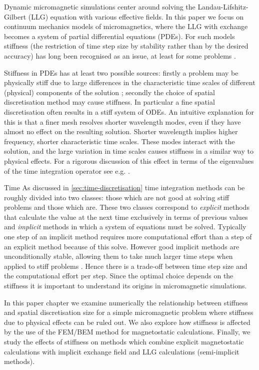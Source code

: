 \documentclass[10pt, final, conference, transmag]{IEEEtran}
\begin{document}
Dynamic micromagnetic simulations  center around solving the Landau-Lifshitz-Gilbert (LLG) equation with various effective fields.
In this paper we focus on continuum mechanics models of micromagnetics, where the LLG with exchange becomes a system of partial differential equations (PDEs).
For such models stiffness (the restriction of time step size by stability rather than by the desired accuracy) has long been recognised as an issue, at least for some problems
\cite{Nakatani1989}.

Stiffness in PDEs has at least two possible sources: 
firstly a problem may be physically stiff due to large differences in the characteristic time scales of different (physical) components of the solution \cite[Chap. 4]{Iserles2009};
secondly the choice of spatial discretisation method may cause stiffness.
In particular a fine spatial discretisation often results in a stiff system of ODEs.
An intuitive explanation for this is that a finer mesh resolves shorter wavelength modes, even if they have almost no effect on the resulting solution.
Shorter wavelength implies higher frequency, \ie shorter characteristic time scales.
These modes interact with the solution, and the large variation in time scales causes stiffness in a similar way to physical effects.
For a rigorous discussion of this effect in terms of the eigenvalues of the time integration operator see e.g. \cite[Sec 8.2]{Atkinson2009}.

\iftransmagpaper Time  \else As discussed in \autoref{sec:time-discretisation} time \fi integration methods can be roughly divided into two classes: those which are not good at solving stiff problems and those which are.
These two classes correspond to \emph{explicit} methods that calculate the value at the next time exclusively in terms of previous values and \emph{implicit} methods in which a system of equations must be solved. 
Typically one step of an implicit method requires more computational effort than a step of an explicit method because of this solve.
However good implicit methods are unconditionally stable, allowing them to take much larger time steps when applied to stiff problems \cite[Chap. 4]{Iserles2009}.
Hence there is a trade-off between time step size and the computational effort per step.
Since the optimal choice depends on the stiffness it is important to understand its origins in micromagnetic simulations.

In this \iftransmagpaper paper \else chapter \fi we examine numerically the relationship between stiffness and spatial discretisation size for a simple micromagnetic problem where stiffness due to physical effects can be ruled out.
We also explore how stiffness is affected by the use of the FEM/BEM method for magnetostatic calculations.
Finally, we study the effects of stiffness on methods which combine explicit magnetostatic calculations with implicit exchange field and LLG calculations (\ie semi-implicit methods).
\end{document}
